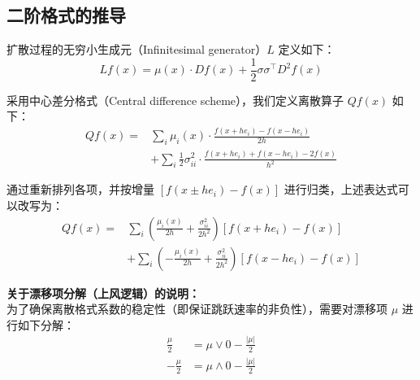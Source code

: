 	
	
	
	
	\subsection{二阶格式的推导}
	
	扩散过程的无穷小生成元（Infinitesimal generator）$L$ 定义如下：
	\begin{equation}
		Lf(x) = \mu(x) \cdot Df(x) + \frac{1}{2} \sigma \sigma^\top D^2 f(x)
	\end{equation}
	
	采用中心差分格式（Central difference scheme），我们定义离散算子 $Qf(x)$ 如下：
	\begin{equation}
		\begin{aligned}
			Qf(x) = & \sum_{i} \mu_i(x) \cdot \frac{f(x+he_i) - f(x-he_i)}{2h} \\
			& + \sum_{i} \frac{1}{2} \sigma_{ii}^2 \cdot \frac{f(x+he_i) + f(x-he_i) - 2f(x)}{h^2}
		\end{aligned}
	\end{equation}
	
	通过重新排列各项，并按增量 $[f(x \pm he_i) - f(x)]$ 进行归类，上述表达式可以改写为：
	\begin{equation}
		\begin{aligned}
			Qf(x) = & \sum_{i} \left( \frac{\mu_i(x)}{2h} + \frac{\sigma_{ii}^2}{2h^2} \right) \left[ f(x+he_i) - f(x) \right] \\
			& + \sum_{i} \left( -\frac{\mu_i(x)}{2h} + \frac{\sigma_{ii}^2}{2h^2} \right) \left[ f(x-he_i) - f(x) \right]
		\end{aligned}
	\end{equation}
	
	\vspace{1em}
	\noindent \textbf{关于漂移项分解（上风逻辑）的说明：} \\
	为了确保离散格式系数的稳定性（即保证跳跃速率的非负性），需要对漂移项 $\mu$ 进行如下分解：
	\begin{align}
		\frac{\mu}{2} &= \mu \vee 0 - \frac{|\mu|}{2} \\
		-\frac{\mu}{2} &= \mu \wedge 0 - \frac{|\mu|}{2}
	\end{align}
	
